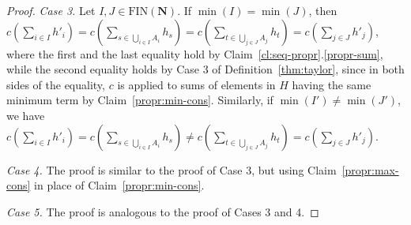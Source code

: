 \documentclass[a4paper,11pt]{article}
\newtheorem{corollary}{Corollary}
\newcommand\Nat{\mathbf{N}}
\newcommand\RCA{\mathsf{RCA}}
\newcommand\RT{\mathsf{RT}}
\newcommand\canHT{\mathsf{canHT}}
\newcommand\CAN{\mathsf{canRT}}
\newcommand\FIN{\mathrm{FIN}}
\newcommand\sW{\mathrm{sW}}
\newcommand\ap{\mathsf{ap}}
\begin{document}
\begin{proof}

\medskip

\emph{Case 3.} Let $I, J \in \FIN(\Nat)$. If $\min(I)=\min(J)$, then $c(\sum_{i \in I} h'_i) = c(\sum_{s \in \bigcup_{i \in I} A_i} h_s) = c(\sum_{t \in \bigcup_{j \in J} A_j} h_t) = c(\sum_{j \in J} h'_j)$, where the first and the last equality hold by  Claim~\ref{cl:seq-propr}.\ref{propr-sum}, while the second equality holds by Case 3 of Definition~\ref{thm:taylor}, since in both sides of the equality, $c$ is applied to sums of elements in $H$ having the same minimum term by Claim~\ref{propr:min-cons}. Similarly, if $\min(I') \neq \min(J')$, we have $c(\sum_{i \in I} h'_i) = c(\sum_{s \in \bigcup_{i \in I} A_i} h_s) \neq c(\sum_{t \in \bigcup_{j \in J} A_j} h_t) = c(\sum_{j \in J} h'_j)$.

\medskip
\emph{Case 4.}  The proof is similar to the proof of Case 3, but using Claim~\ref{propr:max-cons} in place of Claim~\ref{propr:min-cons}.

\medskip

\emph{Case 5.} The proof is analogous to the proof of Cases 3 and 4.

\medskip

\end{proof}

\end{document}
